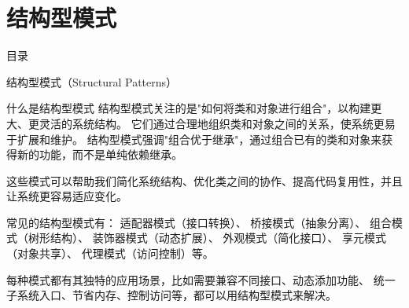 \documentclass[UTF8,aspectratio=169]{beamer}
\begin{document}
\section{结构型模式}
\begin{frame}{目录}
    \begin{multicols}{2}
    \end{multicols}
\end{frame}

\begin{frame}{结构型模式（Structural Patterns）}
    \begin{ytublock}{什么是结构型模式}
        结构型模式关注的是"如何将类和对象进行组合"，以构建更大、更灵活的系统结构。
        它们通过合理地组织类和对象之间的关系，使系统更易于扩展和维护。
        结构型模式强调"组合优于继承"，通过组合已有的类和对象来获得新的功能，而不是单纯依赖继承。

        这些模式可以帮助我们简化系统结构、优化类之间的协作、提高代码复用性，并且让系统更容易适应变化。

        常见的结构型模式有：
        适配器模式（接口转换）、
        桥接模式（抽象分离）、
        组合模式（树形结构）、
        装饰器模式（动态扩展）、
        外观模式（简化接口）、
        享元模式（对象共享）、
        代理模式（访问控制）等。

        每种模式都有其独特的应用场景，比如需要兼容不同接口、动态添加功能、
        统一子系统入口、节省内存、控制访问等，都可以用结构型模式来解决。
    \end{ytublock}
\end{frame}
\end{document}
